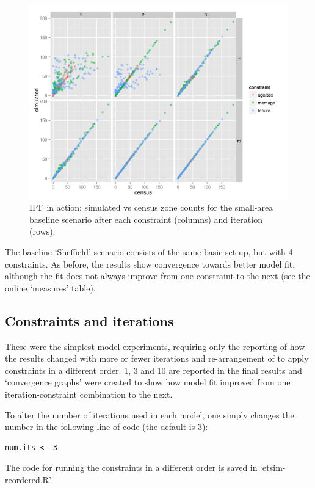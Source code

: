 \documentclass[a4paper,10pt]{article}
\begin{document}
\begin{figure}
 \begin{center}
  \includegraphics[width=12cm]{ipfinac}
 \end{center}
\caption{IPF in action: simulated vs census zone counts for the small-area baseline scenario after each constraint (columns) and iteration (rows).}
\label{fipfinac}
\end{figure}

The baseline `Sheffield' scenario consists of the same basic set-up, 
but with 4 constraints. As before, the results show convergence 
towards better model fit, although the fit does not always improve 
from one constraint to the next (see the online `measures' table). %

\subsection{Constraints and iterations}
These were the simplest model experiments, requiring only
 the reporting of how the results changed with more or fewer
iterations and re-arrangement of to apply constraints
in a different order. 1, 3 and 10 are reported in the final
results and `convergence graphs' were created to show how model
fit improved from one iteration-constraint combination to the next.

To alter the number of iterations used in each model, one simply
changes the number in the following line of code (the default is 3):

\begin{lstlisting}
num.its <- 3
\end{lstlisting}
 
The code for running the constraints in a different order
is saved in `etsim-reordered.R'.
\end{document}
